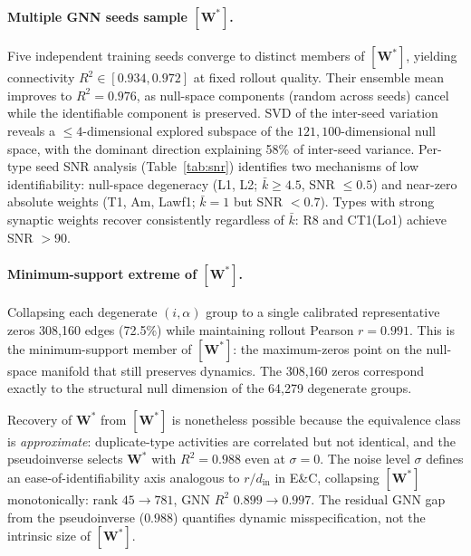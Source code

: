 \documentclass[11pt,a4paper]{article}
\begin{document}
\paragraph{Multiple GNN seeds sample $[\mathbf{W}^*]$.}
Five independent training seeds converge to distinct members of $[\mathbf{W}^*]$,
yielding connectivity $R^2 \in [0.934, 0.972]$ at fixed rollout quality.  Their
ensemble mean improves to $R^2=0.976$, as null-space components (random across
seeds) cancel while the identifiable component is preserved.  SVD of the
inter-seed variation reveals a $\leq 4$-dimensional explored subspace of the
$121{,}100$-dimensional null space, with the dominant direction explaining 58\%
of inter-seed variance.  Per-type seed SNR analysis (Table~\ref{tab:snr}) identifies two mechanisms
of low identifiability: null-space degeneracy (L1, L2; $\bar{k} \geq 4.5$,
SNR $\leq 0.5$) and near-zero absolute weights (T1, Am, Lawf1; $\bar{k}=1$
but SNR $< 0.7$).  Types with strong synaptic weights recover consistently
regardless of $\bar{k}$: R8 and CT1(Lo1) achieve SNR $> 90$.

\paragraph{Minimum-support extreme of $[\mathbf{W}^*]$.}
Collapsing each degenerate $(i,\alpha)$ group to a single calibrated
representative zeros 308,160 edges (72.5\%) while maintaining rollout Pearson
$r = 0.991$.  This is the minimum-support member of $[\mathbf{W}^*]$:
the maximum-zeros point on the null-space manifold that still preserves dynamics.
The 308,160 zeros correspond exactly to the structural null dimension of the
64,279 degenerate groups.

Recovery of $\mathbf{W}^*$ from $[\mathbf{W}^*]$ is nonetheless possible because
the equivalence class is \emph{approximate}: duplicate-type activities are
correlated but not identical, and the pseudoinverse selects $\mathbf{W}^*$ with
$R^2 = 0.988$ even at $\sigma=0$. The noise level $\sigma$ defines an
ease-of-identifiability axis analogous to $r/d_{\text{in}}$ in E\&C, collapsing
$[\mathbf{W}^*]$ monotonically: rank $45 \to 781$, GNN $R^2$ $0.899 \to 0.997$.
The residual GNN gap from the pseudoinverse ($0.988$) quantifies dynamic
misspecification, not the intrinsic size of $[\mathbf{W}^*]$.
\end{document}
